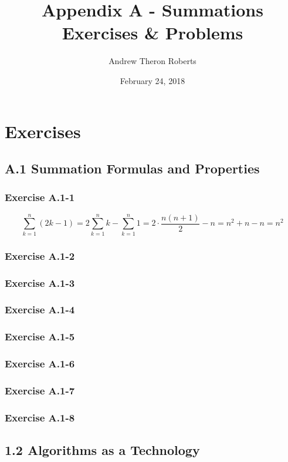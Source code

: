 \documentclass{article}
\title{Appendix A - Summations\\
Exercises \& Problems}
\date{February 24, 2018}
\author{Andrew Theron Roberts}
\begin{document}
\maketitle
{}

\section*{Exercises}

\subsection*{A.1 Summation Formulas and Properties}
\subsubsection*{Exercise A.1-1}

$$\sum_{k=1}^{n}(2k-1) = 2\sum_{k=1}^{n}k - \sum_{k=1}^{n}1 = 2 \cdot \frac{n(n+1)}{2} - n = n^2 + n - n = n^2$$

\subsubsection*{Exercise A.1-2}


\subsubsection*{Exercise A.1-3}


\subsubsection*{Exercise A.1-4}


\subsubsection*{Exercise A.1-5}
\subsubsection*{Exercise A.1-6}
\subsubsection*{Exercise A.1-7}
\subsubsection*{Exercise A.1-8}


\subsection*{1.2 Algorithms as a Technology}
\end{document}
